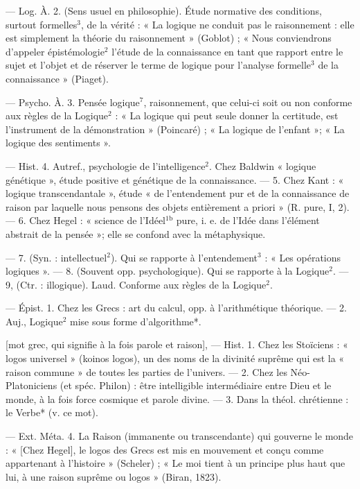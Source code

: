\begin{itemize}[leftmargin=1cm, label=, itemsep=1pt]
— Log. À. 2. (Sens usuel en philosophie). Étude normative des conditions, surtout formelles$^3$, de la vérité :
« La logique ne conduit pas le
raisonnement : elle est simplement
la théorie du raisonnement » (Goblot) ; « Nous conviendrons d'appeler
épistémologie$^2$ l'étude de la connaissance en tant que rapport entre le
sujet et l’objet et de réserver le
terme de logique pour l'analyse formelle$^3$ de la connaissance » (Piaget).

— Psycho. À. 3. Pensée logique$^7$,
raisonnement, que celui-ci soit ou
non conforme aux règles de la Logique$^2$ : « La logique qui peut seule
donner la certitude, est l’instrument de la démonstration » (Poincaré) ; « La logique de l’enfant »;
« La logique des sentiments ».

— Hist. 4. Autref., psychologie
de l’intelligence$^2$. Chez Baldwin
« logique génétique », étude positive et génétique de la connaissance.
— 5. Chez Kant : « logique transcendantale », étude « de l’entendement pur et de la connaissance de
raison par laquelle nous pensons
des objets entièrement a priori »
(R. pure, I, 2). — 6. Chez Hegel :
« science de l'Idéel$^\text{1b}$ pure, i. e. de
l’Idée dans l'élément abstrait de la
pensée »; elle se confond avec la
métaphysique.

 — 7. (Syn. : intellectuel$^2$). Qui se rapporte à l’entendement$^3$ : « Les opérations logiques ».
— 8. (Souvent opp. psychologique).
Qui se rapporte à la Logique$^2$. — 9,
(Ctr. : illogique). Laud. Conforme
aux règles de la Logique$^2$.

 — Épist. 1. Chez les Grecs :
art du calcul, opp. à l’arithmétique
théorique. — 2. Auj., Logique$^2$ mise
sous forme d’algorithme*.

 [mot grec, qui signifie à la fois
parole et raison], — Hist. 1. Chez
les Stoïciens : « logos universel »
(koinos logos), un des noms de la
divinité suprême qui est la « raison
commune » de toutes les parties de
l'univers. — 2. Chez les Néo-Platoniciens (et spéc. Philon) : être intelligible intermédiaire entre Dieu et
le monde, à la fois force cosmique et
parole divine. — 3. Dans la théol.
chrétienne : le Verbe* (v. ce mot).

— Ext. Méta. 4. La Raison (immanente ou transcendante) qui
gouverne le monde : « [Chez Hegel],
le logos des Grecs est mis en mouvement et conçu comme appartenant à l’histoire » (Scheler) ; « Le
moi tient à un principe plus haut
que lui, à une raison suprême ou
logos » (Biran, 1823).


\end{itemize}
